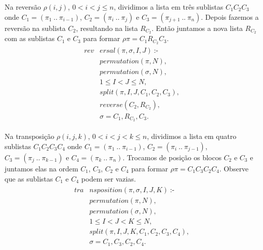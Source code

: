 Na reversão $\rho(i,j)$, $0 < i < j \leq n$, dividimos a lista em três
sublistas $C_{1}C_{2}C_{3}$ onde $C_{1} = (\pi_{1}~..~\pi_{i-1})$,
$C_{2} = (\pi_{i}~..~\pi_{j})$ e $C_{3} =
(\pi_{j+1}~..~\pi_{n})$. Depois fazemos a reversão na sublista
$C_{2}$, resultando na lista $R_{C_{2}}$. Então juntamos a nova lista
$R_{C_{2}}$ com as sublistas $C_{1}$ e $C_{3}$ para formar $\rho\pi =
C_{1}R_{C_{2}}C_{3}$.
\begin{align}
  \label{reversal}
  \begin{split}
  \textit{rev}&\textit{ersal}(\pi, \sigma, I, J)~\text{:-} \\
  &\textit{permutation}(\pi, N), \\
  &\textit{permutation}(\sigma, N),  \\
  &1 \le I < J \le N, \\
  &\textit{split}(\pi, I, J, C_{1}, C_{2}, C_{3}), \\
  &\textit{reverse}(C_{2}, R_{C_{2}}),  \\
  &\sigma = C_{1}, R_{C_{2}}, C_{3}. 
  \end{split}
\end{align}

Na transposição $\rho(i,j,k)$, $0 < i < j < k\leq n$, dividimos a
lista em quatro sublistas $C_{1}C_{2}C_{3}C_{4}$ onde $C_{1} =
(\pi_{1}~..~\pi_{i-1})$, $C_{2} = (\pi_{i}~..~\pi_{j-1})$, $C_{3} =
(\pi_{j}~..~\pi_{k-1})$ e $C_{4} = (\pi_{k}~..~\pi_{n})$. Trocamos de
posição os blocos $C_{2}$ e $C_{3}$ e juntamos elas na ordem $C_{1}$,
$C_{3}$, $C_{2}$ e $C_{4}$ para formar $\rho\pi =
C_{1}C_{3}C_{2}C_{4}$. Observe que as sublistas $C_{1}$ e $C_{4}$
podem ser vazias.
\begin{align}
  \label{transposition}
  \begin{split}
  \textit{tra}&\textit{nsposition}(\pi, \sigma, I, J, K)~\text{:-} \\
  &\textit{permutation}(\pi, N), \\
  &\textit{permutation}(\sigma, N), \\
  &1 \le I < J < K \le N,  \\
  &\textit{split}(\pi, I, J, K, C_{1}, C_{2}, C_{3}, C_{4}), \\
  &\sigma = C_{1}, C_{3}, C_{2}, C_{4}. 
  \end{split}
\end{align}

